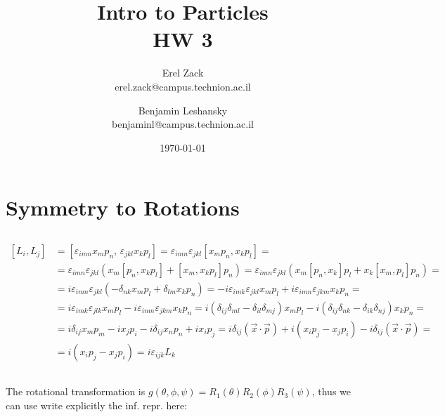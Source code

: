 \documentclass[11pt]{article}
\title{Intro to Particles \\ HW 3}
\author{Erel Zack \\ erel.zack@campus.technion.ac.il \and Benjamin Leshansky
 \\ benjaminl@campus.technion.ac.il}
\date{\today}
\begin{document}
\maketitle

\section{Symmetry to Rotations}

\subsection{}

\begin{equation}
\begin{split}
    [L_i,L_j] &= 
    [\varepsilon_{imn}x_m p_n,\, \varepsilon_{jkl}x_k p_l] =
    \varepsilon_{imn}\varepsilon_{jkl}[x_mp_n, x_kp_l]=\\
    &=
    \varepsilon_{imn}\varepsilon_{jkl} (x_m[p_n,x_kp_l] + [x_m,x_kp_l]p_n)=
    \varepsilon_{imn}\varepsilon_{jkl}(x_m[p_n,x_k]p_l + x_k[x_m,p_l]p_n)=\\
    &= 
    i\varepsilon_{imn}\varepsilon_{jkl}(-\delta_{nk}x_m p_l + \delta_{lm}x_k p_n) = 
    -i\varepsilon_{imk}\varepsilon_{jkl}x_mp_l + i\varepsilon_{imn}\varepsilon_{jkm}x_kp_n=\\
    &=
    i\varepsilon_{imk}\varepsilon_{jlk}x_m p_l - i\varepsilon_{inm}\varepsilon_{jkm}x_k p_n =
    i(\delta_{ij}\delta_{ml}-\delta_{il}\delta_{mj})x_m p_l - i(\delta_{ij}\delta_{nk}-\delta_{ik}\delta_{nj})x_k p_n =\\
    &=
    i\delta_{ij}x_m p_m - i x_j p_i - i\delta_{ij} x_n p_n + i x_i p_j =
    i\delta_{ij}(\vec x\cdot\vec p) + i(x_ip_j-x_jp_i) - i\delta_{ij}(\vec x\cdot\vec p) =\\
    &=
    i(x_i p_j-x_j p_i)=
    i\varepsilon_{ijk}L_k
\end{split}
\end{equation}

\subsection{}
The rotational transformation is $g(\theta , \phi , \psi ) = R_1 (\theta) R_2(\phi)R_3(\psi)$, thus we can use write explicitly the inf. repr. here: $$$$ 
\end{document}

